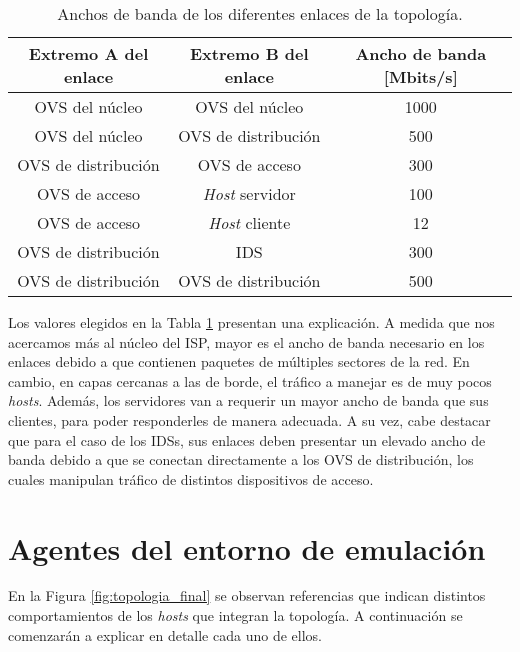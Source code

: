 \begin{table}[H]
	\centering
	\begin{tabular}{|c|c|c|}
		\hline
		\cellcolor[HTML]{EFEFEF}\textbf{Extremo A del enlace}  & \cellcolor[HTML]{EFEFEF}\textbf{Extremo B del enlace}  & \cellcolor[HTML]{EFEFEF}\textbf{Ancho de banda [Mbits/s]}  \\ \hline
		OVS del núcleo      & OVS del núcleo         & 1000 \\ \hline
		OVS del núcleo      & OVS de distribución    & 500  \\ \hline
		OVS de distribución & OVS de acceso          & 300  \\ \hline
		OVS de acceso       & \textit{Host} servidor & 100  \\ \hline
		OVS de acceso       & \textit{Host} cliente  & 12   \\ \hline
		OVS de distribución & IDS                    & 300  \\ \hline
		OVS de distribución & OVS de distribución    & 500  \\ \hline
	\end{tabular}
	\caption{Anchos de banda de los diferentes enlaces de la topología.}
	\label{tab:bw_links}
\end{table}


Los valores elegidos en la Tabla \ref{tab:bw_links} presentan una explicación. A medida que nos acercamos más al núcleo del ISP, mayor es el ancho de banda necesario en los enlaces debido a que contienen paquetes de múltiples sectores de la red. En cambio, en capas cercanas a las de borde, el tráfico a manejar es de muy pocos \textit{hosts}. Además, los servidores van a requerir un mayor ancho de banda que sus clientes, para poder responderles de manera adecuada. A su vez, cabe destacar que para el caso de los IDSs, sus enlaces deben presentar un elevado ancho de banda debido a que se conectan directamente a los OVS de distribución, los cuales manipulan tráfico de distintos dispositivos de acceso. 


\section {Agentes del entorno de emulación} \label{sec:agentes_emulacion}

En la Figura \ref{fig:topologia_final} se observan referencias que indican
distintos comportamientos de los \textit{hosts} que integran la topología. A
continuación se comenzarán a explicar en detalle cada uno de ellos.

